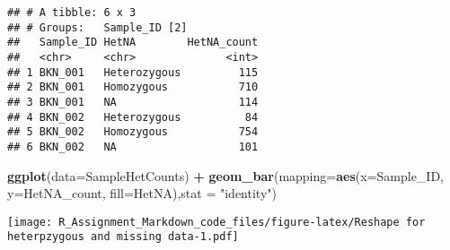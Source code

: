 \documentclass[]{article}
\newenvironment{Shaded}{\begin{snugshade}}{\end{snugshade}}
\newcommand{\KeywordTok}[1]{\textcolor[rgb]{0.13,0.29,0.53}{\textbf{#1}}}
\newcommand{\DataTypeTok}[1]{\textcolor[rgb]{0.13,0.29,0.53}{#1}}
\newcommand{\DecValTok}[1]{\textcolor[rgb]{0.00,0.00,0.81}{#1}}
\newcommand{\StringTok}[1]{\textcolor[rgb]{0.31,0.60,0.02}{#1}}
\newcommand{\CommentTok}[1]{\textcolor[rgb]{0.56,0.35,0.01}{\textit{#1}}}
\newcommand{\OperatorTok}[1]{\textcolor[rgb]{0.81,0.36,0.00}{\textbf{#1}}}
\newcommand{\NormalTok}[1]{#1}
\begin{document}
\begin{Shaded}
\end{Shaded}

\begin{verbatim}
## # A tibble: 6 x 3
## # Groups:   Sample_ID [2]
##   Sample_ID HetNA        HetNA_count
##   <chr>     <chr>              <int>
## 1 BKN_001   Heterozygous         115
## 2 BKN_001   Homozygous           710
## 3 BKN_001   NA                   114
## 4 BKN_002   Heterozygous          84
## 5 BKN_002   Homozygous           754
## 6 BKN_002   NA                   101
\end{verbatim}

\begin{Shaded}
\begin{Highlighting}[]
\KeywordTok{ggplot}\NormalTok{(}\DataTypeTok{data=}\NormalTok{SampleHetCounts) }\OperatorTok{+}\StringTok{ }\KeywordTok{geom_bar}\NormalTok{(}\DataTypeTok{mapping=}\KeywordTok{aes}\NormalTok{(}\DataTypeTok{x=}\NormalTok{Sample_ID, }\DataTypeTok{y=}\NormalTok{HetNA_count, }\DataTypeTok{fill=}\NormalTok{HetNA),}\DataTypeTok{stat =} \StringTok{"identity"}\NormalTok{)}
\end{Highlighting}
\end{Shaded}

\texttt{[image: R\_Assignment\_Markdown\_code\_files/figure-latex/Reshape for heterpzygous and missing data-1.pdf]}

\begin{Shaded}
\end{Shaded}
\end{document}
